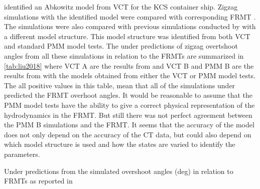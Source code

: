 \textcite{liuPredictionsShipManeuverability2018} identified an Abkowitz model from VCT for the KCS container ship. Zigzag simulations with the identified model were compared with corresponding FRMT \cite{simmanWorkshopVerificationValidation2014}. The simulations were also compared with previous simulations conducted by  \textcite{simonsenKCSPMMTests2014}  with a different model structure. This model structure was identified from both VCT and standard PMM model tests.  The under predictions of zigzag overtshoot angles from all these simulations in relation to the FRMTs are summarized in \autoref{tab:liu2018}  where VCT A are the results from \textcite{liuPredictionsShipManeuverability2018} and VCT B and PMM B are the results from \textcite{simonsenKCSPMMTests2014} with the models obtained from either the VCT or PMM model tests.    
The all positive values in this table, mean that all of the simulations under predicted the FRMT overhoot angles. 
It would be reasonable to assume that the PMM model tests have the ability to give a correct physical representation of the hydrodynamics in the FRMT. But still there was not perfect agreement between the PMM B simulations and the FRMT. It seems that the accuracy of the model does not only depend on the accuracy of the CT data, but could also depend on which model structure is used and how the states are varied to identify the parameters.
\begin{table}[h]
    \centering
    \caption{Under predictions from the simulated overshoot angles (deg) in relation to FRMTs as reported in \textcite{liuPredictionsShipManeuverability2018}}
    \label{tab:liu2018}
\end{table}